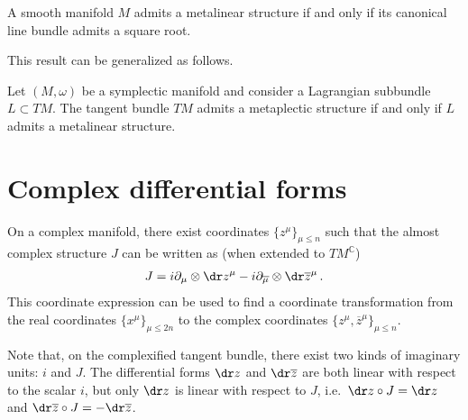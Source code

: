     \begin{result}
        A smooth manifold $M$ admits a metalinear structure if and only if its canonical line bundle admits a square root.
    \end{result}
    This result can be generalized as follows.

    \begin{property}\label{complex:metaplectic}
        Let $(M,\omega)$ be a symplectic manifold and consider a Lagrangian subbundle $L\subset TM$. The tangent bundle $TM$ admits a metaplectic structure if and only if $L$ admits a metalinear structure.
    \end{property}

\section{Complex differential forms}

    \begin{property}
        On a complex manifold, there exist coordinates $\{z^\mu\}_{\mu\leq n}$ such that the almost complex structure $J$ can be written as (when extended to $TM^{\mathbb{C}}$)
        \begin{gather}
            \label{complex:complex_structure}
            J = i\partial_\mu\otimes\dr z^\mu - i\partial_{\overline\mu}\otimes\dr\overline{z}^\mu\,.
        \end{gather}
        This coordinate expression can be used to find a coordinate transformation from the real coordinates $\{x^\mu\}_{\mu\leq2n}$ to the complex coordinates $\{z^\mu,\overline{z}^\mu\}_{\mu\leq n}$.
    \end{property}
    \begin{remark}
        Note that, on the complexified tangent bundle, there exist two kinds of imaginary units: $i$ and $J$. The differential forms $\dr z$ and $\dr\overline{z}$ are both linear with respect to the scalar $i$, but only $\dr z$ is linear with respect to $J$, i.e.~$\dr z\circ J=\dr z$ and $\dr\overline{z}\circ J=-\dr\overline{z}$.
    \end{remark}

